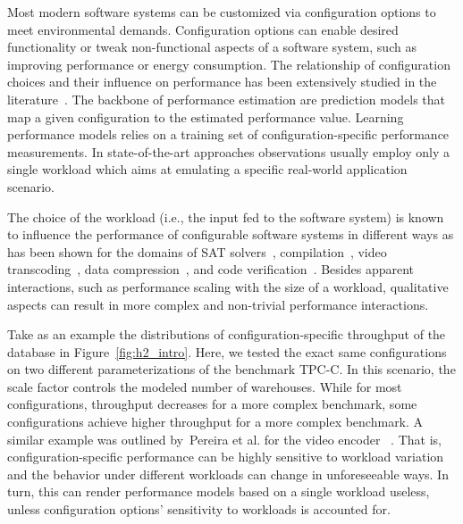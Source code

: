 
Most modern software systems can be customized via configuration options to meet environmental demands. Configuration options can enable desired functionality or tweak non-functional aspects of a software system, such as improving performance or energy consumption. The relationship of configuration choices and their influence on performance has been extensively studied in the literature~\cite{dorn2020,siegmundPerformanceinfluenceModelsHighly2015,haDeepPerf2019,perfAL,guoVariabilityawarePerformancePrediction2013,sarkarCostEfficientSamplingPerformance,guo_2018_data,fourier_learning_2015,perLasso}. The backbone of performance estimation are prediction models that map a given configuration to the estimated performance value. Learning performance models relies on a training set of configuration-specific performance measurements. In state-of-the-art approaches observations usually employ only a single workload which aims at emulating a specific real-world application scenario.

The choice of the workload (i.e., the input fed to the software system) is known to influence the performance of configurable software systems in different ways as has been shown for the domains of SAT solvers~\cite{falkner_sat_solvers_2015,satzilla_2008}, compilation~\cite{ding_compilation_2015,plotnikov_compilation_2013}, video transcoding~\cite{maxiaguine_workload_2004,alves_sampling_2020}, data compression~\cite{khavari_compression_2019}, and code verification~\cite{koc_satune_2021}. Besides apparent interactions, such as performance scaling with the size of a workload, qualitative aspects can result in more complex and non-trivial performance interactions.

Take as an example the distributions of configuration-specific throughput of the database \htwo in Figure~\ref{fig:h2_intro}. Here, we tested the exact same configurations on two different parameterizations of the benchmark TPC-C. In this scenario, the scale factor controls the modeled number of warehouses. While for most configurations, throughput decreases for a more complex benchmark, some configurations achieve higher throughput for a more complex benchmark. A similar example was outlined by~Pereira et al. for the video encoder \xzwo~\cite{alves_sampling_2020}. That is, configuration-specific performance can be highly sensitive to workload variation and the behavior under different workloads can change in unforeseeable ways. In turn, this can render performance models based on a single workload useless, unless configuration options’ sensitivity to workloads is accounted for.

